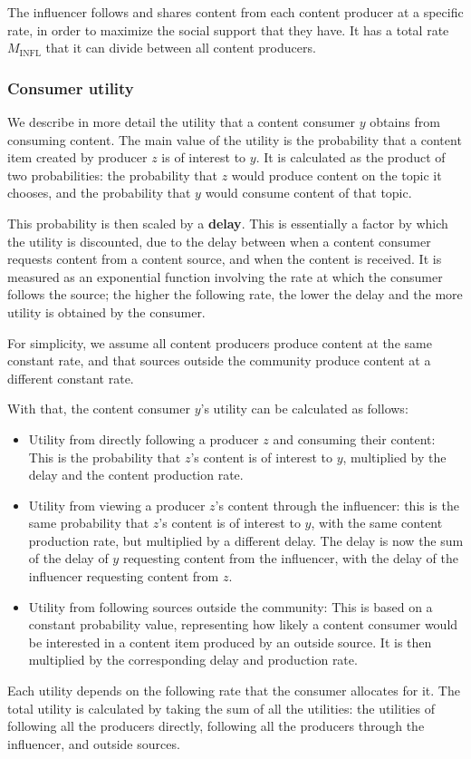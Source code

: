 \documentclass[11pt, letterpaper]{article}
\begin{document}
The influencer follows and shares content from each content producer at a specific rate, in order to maximize the social support that they have. It has a total rate \(M_\text{INFL}\) that it can divide between all content producers.

\subsubsection{Consumer utility}

We describe in more detail the utility that a content consumer \(y\) obtains from consuming content. The main value of the utility is the probability that a content item created by producer \(z\) is of interest to \(y\). It is calculated as the product of two probabilities: the probability that \(z\) would produce content on the topic it chooses, and the probability that \(y\) would consume content of that topic.

This probability is then scaled by a \textbf{delay}. This is essentially a factor by which the utility is discounted, due to the delay between when a content consumer requests content from a content source, and when the content is received. It is measured as an exponential function involving the rate at which the consumer follows the source; the higher the following rate, the lower the delay and the more utility is obtained by the consumer.

For simplicity, we assume all content producers produce content at the same constant rate, and that sources outside the community produce content at a different constant rate.

With that, the content consumer \(y\)'s utility can be calculated as follows:
\begin{itemize}
    \item Utility from directly following a producer \(z\) and consuming their content: This is the probability that \(z\)'s content is of interest to \(y\), multiplied by the delay and the content production rate.
    \item Utility from viewing a producer \(z\)'s content through the influencer: this is the same probability that \(z\)'s content is of interest to \(y\), with the same content production rate, but multiplied by a different delay. The delay is now the sum of the delay of \(y\) requesting content from the influencer, with the delay of the influencer requesting content from \(z\).
    \item Utility from following sources outside the community: This is based on a constant probability value, representing how likely a content consumer would be interested in a content item produced by an outside source. It is then multiplied by the corresponding delay and production rate.
\end{itemize}
Each utility depends on the following rate that the consumer allocates for it. The total utility is calculated by taking the sum of all the utilities: the utilities of following all the producers directly, following all the producers through the influencer, and outside sources.
\end{document}
